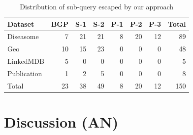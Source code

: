 \documentclass{sig-alternate}  %
\begin{document}
\begin{table}
\centering
\begin{tabular}{lrrrrrrr}
\hline
Dataset		&BGP 	&S-1&S-2&P-1&P-2&P-3&Total \\\hline
Diseasome				&7		&21	&21	&8	&20	&12	&89\\
Geo 	&10		&15	&23	&0	&0	&0	&48\\
LinkedMDB				&5		&0	&0	&0	&0	&0	&5\\
Publication			&1		&2	&5	&0	&0	&0	&8\\\hline
Total 					&23		&38	&49	&8	&20	&12	&150 \\\hline
\end{tabular}
\caption{Distribution of sub-query escaped by our approach}
\label{tab:escaped}
\end{table}





\section{Discussion (AN)}
\end{document}
